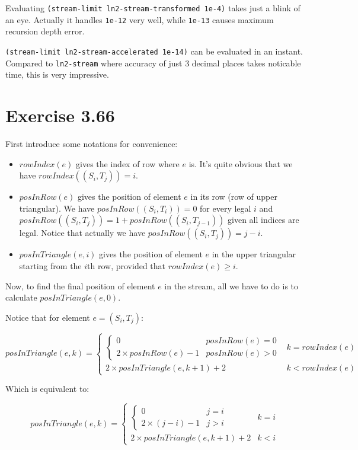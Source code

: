 \documentclass[../main.tex]{subfiles}
\begin{document}
Evaluating \lstinline{(stream-limit ln2-stream-transformed 1e-4)} takes just a blink of an eye. Actually it handles \lstinline{1e-12} very well, while \lstinline{1e-13} causes maximum recursion depth error.

\lstinline{(stream-limit ln2-stream-accelerated 1e-14)} can be evaluated in an instant. Compared to \lstinline{ln2-stream} where accuracy of just 3 decimal places takes noticable time, this is very impressive.

\section{Exercise 3.66}

First introduce some notations for convenience:

\begin{itemize}
\item $rowIndex(e)$ gives the index of row where $e$ is. It's quite obvious that we have $rowIndex((S_i, T_j)) = i$.
\item $posInRow(e)$ gives the position of element $e$ in its row (row of upper triangular). We have $posInRow((S_i, T_i)) = 0$ for every legal $i$ and $posInRow((S_i, T_j)) = 1 + posInRow((S_i, T_{j-1}))$ given all indices are legal. Notice that actually we have $posInRow((S_i, T_j)) = j - i$.
\item $posInTriangle(e, i)$ gives the position of element $e$ in the upper triangular starting from the $i$th row, provided that $rowIndex(e) \ge i$.
\end{itemize}

Now, to find the final position of element $e$ in the stream, all we have to do is to calculate $posInTriangle(e, 0)$.

Notice that for element $e = (S_i, T_j)$:

$$
posInTriangle(e, k) =
\begin{cases}
	\begin{cases}
		0 & posInRow(e) = 0\\
		2 \times posInRow(e) - 1 & posInRow(e) > 0
	\end{cases} & k = rowIndex(e)\\
	2 \times posInTriangle(e, k + 1) + 2 & k < rowIndex(e)
\end{cases}
$$

Which is equivalent to:

$$
posInTriangle(e, k) =
\begin{cases}
	\begin{cases}
		0 & j = i\\
		2 \times (j - i) - 1 & j > i
	\end{cases} & k = i\\
	2 \times posInTriangle(e, k + 1) + 2 & k < i
\end{cases}
$$
\end{document}
